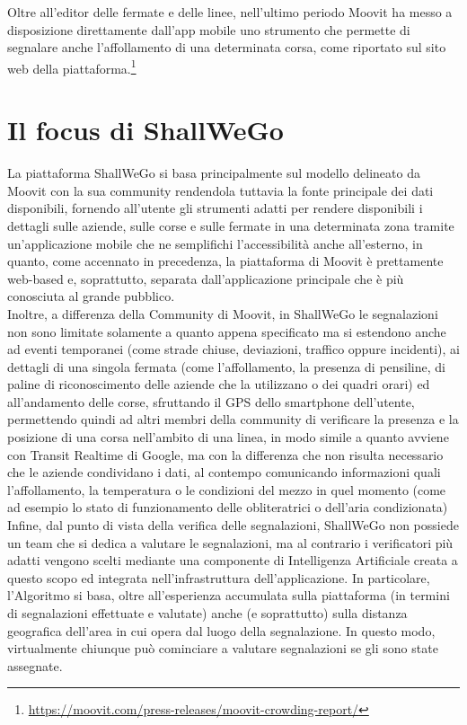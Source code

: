     Oltre all'editor delle fermate e delle linee, nell'ultimo periodo Moovit ha messo a disposizione direttamente dall'app mobile uno strumento che permette di segnalare anche l'affollamento di una determinata corsa, come riportato sul sito web della piattaforma.\footnote[4]{\url{https://moovit.com/press-releases/moovit-crowding-report/}}

\section{Il focus di ShallWeGo}
    La piattaforma ShallWeGo si basa principalmente sul modello delineato da Moovit con la sua community rendendola tuttavia la fonte principale dei dati disponibili, fornendo all'utente gli strumenti adatti per rendere disponibili i dettagli sulle aziende, sulle corse e sulle fermate in una determinata zona tramite un'applicazione mobile che ne semplifichi l'accessibilità anche all'esterno, in quanto, come accennato in precedenza, la piattaforma di Moovit è prettamente web-based e, soprattutto, separata dall'applicazione principale che è più conosciuta al grande pubblico. \\
    Inoltre, a differenza della Community di Moovit, in ShallWeGo le segnalazioni non sono limitate solamente a quanto appena specificato ma si estendono anche ad eventi temporanei (come strade chiuse, deviazioni, traffico oppure incidenti), ai dettagli di una singola fermata (come l'affollamento, la presenza di pensiline, di paline di riconoscimento delle aziende che la utilizzano o dei quadri orari) ed all'andamento delle corse, sfruttando il GPS dello smartphone dell'utente, permettendo quindi ad altri membri della community di verificare la presenza e la posizione di una corsa nell'ambito di una linea, in modo simile a quanto avviene con Transit Realtime di Google, ma con la differenza che non risulta necessario che le aziende condividano i dati, al contempo comunicando informazioni quali l'affollamento, la temperatura o le condizioni del mezzo in quel momento (come ad esempio lo stato di funzionamento delle obliteratrici o dell'aria condizionata) \\
    Infine, dal punto di vista della verifica delle segnalazioni, ShallWeGo non possiede un team che si dedica a valutare le segnalazioni, ma al contrario i verificatori più adatti vengono scelti mediante una componente di Intelligenza Artificiale creata a questo scopo ed integrata nell'infrastruttura dell'applicazione. In particolare, l'Algoritmo si basa, oltre all'esperienza accumulata sulla piattaforma (in termini di segnalazioni effettuate e valutate) anche (e soprattutto) sulla distanza geografica dell'area in cui opera dal luogo della segnalazione. In questo modo, virtualmente chiunque può cominciare a valutare segnalazioni se gli sono state assegnate. 





        

    


